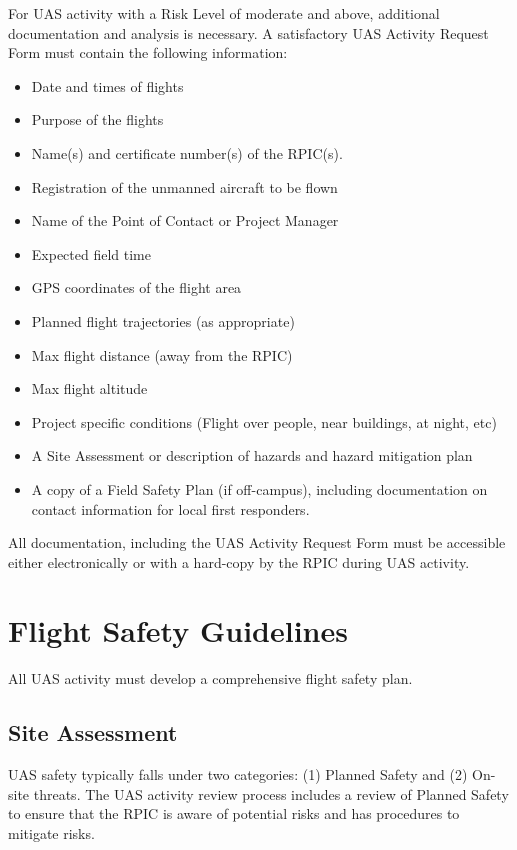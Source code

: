 \documentclass[
]{book}
\providecommand{\tightlist}{%
  \setlength{\itemsep}{0pt}\setlength{\parskip}{0pt}}
\begin{document}
For UAS activity with a Risk Level of moderate and above, additional documentation and analysis is necessary. A satisfactory UAS Activity Request Form must contain the following information:

\begin{itemize}
\tightlist
\item
  Date and times of flights
\item
  Purpose of the flights
\item
  Name(s) and certificate number(s) of the RPIC(s).
\item
  Registration of the unmanned aircraft to be flown
\item
  Name of the Point of Contact or Project Manager
\item
  Expected field time
\item
  GPS coordinates of the flight area
\item
  Planned flight trajectories (as appropriate)
\item
  Max flight distance (away from the RPIC)
\item
  Max flight altitude
\item
  Project specific conditions (Flight over people, near buildings, at night, etc)
\item
  A Site Assessment or description of hazards and hazard mitigation plan
\item
  A copy of a Field Safety Plan (if off-campus), including documentation on contact information for local first responders.
\end{itemize}

All documentation, including the UAS Activity Request Form must be accessible either electronically or with a hard-copy by the RPIC during UAS activity.

\chapter{Flight Safety Guidelines}\label{ch-flight-safety}

All UAS activity must develop a comprehensive flight safety plan.

\section{Site Assessment}\label{site-assessment}

UAS safety typically falls under two categories: (1) Planned Safety and (2) On-site threats. The UAS activity review process includes a review of Planned Safety to ensure that the RPIC is aware of potential risks and has procedures to mitigate risks.
\end{document}

